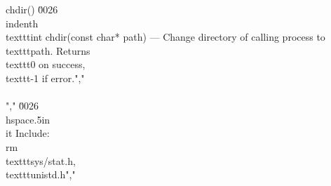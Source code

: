 {chdir()} \u0026 \\indenth\\texttt{int chdir(const char* path)} --- Change directory of calling process to \\texttt{path}. Returns \\texttt{0} on success, \\texttt{-1} if error.","        \\\\","    \u0026 \\hspace{.5in}\\it Include: \\rm\\texttt{sys/stat.h}, \\texttt{unistd.h}","        %